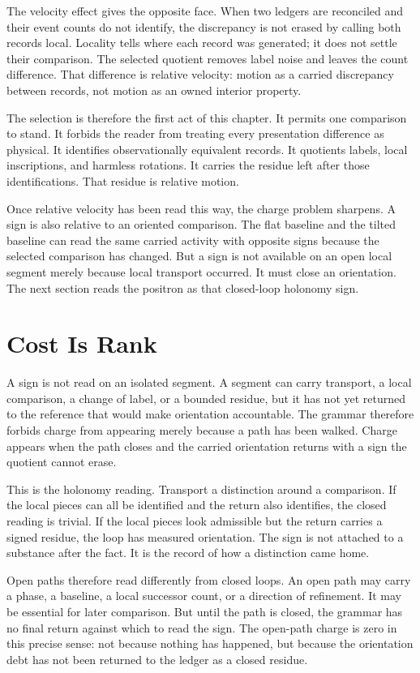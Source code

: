 The velocity effect gives the opposite face. When two ledgers are reconciled
and their event counts do not identify, the discrepancy is not erased by
calling both records local. Locality tells where each record was generated;
it does not settle their comparison. The selected quotient removes label
noise and leaves the count difference. That difference is relative velocity:
motion as a carried discrepancy between records, not motion as an owned
interior property.

The selection is therefore the first act of this chapter. It permits one
comparison to stand. It forbids the reader from treating every presentation
difference as physical. It identifies observationally equivalent records. It
quotients labels, local inscriptions, and harmless rotations. It carries the
residue left after those identifications. That residue is relative motion.

Once relative velocity has been read this way, the charge problem sharpens.
A sign is also relative to an oriented comparison. The flat baseline and the
tilted baseline can read the same carried activity with opposite signs
because the selected comparison has changed. But a sign is not available on
an open local segment merely because local transport occurred. It must close
an orientation. The next section reads the positron as that closed-loop
holonomy sign.

\section{Cost Is Rank}

A sign is not read on an isolated segment. A segment can carry transport, a
local comparison, a change of label, or a bounded residue, but it has not yet
returned to the reference that would make orientation accountable. The grammar
therefore forbids charge from appearing merely because a path has been
walked. Charge appears when the path closes and the carried orientation
returns with a sign the quotient cannot erase.

This is the holonomy reading. Transport a distinction around a comparison.
If the local pieces can all be identified and the return also identifies, the
closed reading is trivial. If the local pieces look admissible but the return
carries a signed residue, the loop has measured orientation. The sign is not
attached to a substance after the fact. It is the record of how a
distinction came home.

Open paths therefore read differently from closed loops. An open path may
carry a phase, a baseline, a local successor count, or a direction of
refinement. It may be essential for later comparison. But until the path is
closed, the grammar has no final return against which to read the sign. The
open-path charge is zero in this precise sense: not because nothing has
happened, but because the orientation debt has not been returned to the
ledger as a closed residue.

